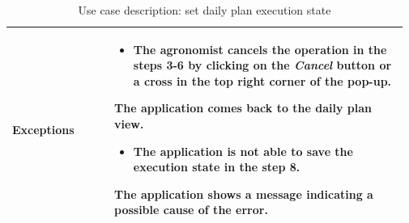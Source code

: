 \begin{table}[H]
\begin{tabular}{@{}p{0.25\linewidth} p{0.72\linewidth}@{}}
		\textbf{Exceptions}         & \begin{itemize}[leftmargin=.4cm,noitemsep,topsep=0pt,before=\vspace{-3mm}]
		   \item The agronomist cancels the operation in the steps 3-6 by clicking on the \textit{Cancel} button or a cross in the top right corner of the pop-up.
		\end{itemize}
		The application comes back to the daily plan view.
	    \begin{itemize}[leftmargin=.4cm,noitemsep,topsep=0pt]
		   \item The application is not able to save the execution state in the step 8. 
		\end{itemize}
		The application shows a message indicating a possible cause of the error.
	    \\\bottomrule
	\end{tabular}
	\caption{Use case description: set daily plan execution state} 
\end{table}

